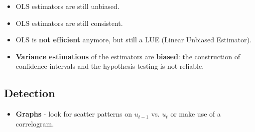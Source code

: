 \documentclass[10pt, a4paper, landscape]{article}
\begin{document}
\begin{multicols}{3}
\begin{itemize}[leftmargin=*]
	\item OLS estimators are still unbiased.
	\item OLS estimators are still consistent.
	\item OLS is \textbf{not efficient} anymore, but still a LUE (Linear Unbiased Estimator).
	\item \textbf{Variance estimations} of the estimators are \textbf{biased}: the construction of confidence intervals and the hypothesis testing is not reliable.
\end{itemize}

\subsection*{Detection}

\begin{itemize}[leftmargin=*]
	\item \textbf{Graphs} - look for scatter patterns on \( u_{t - 1} \) vs. \( u_{t} \) or make use of a correlogram.
	

\end{itemize}
\end{multicols}
\end{document}
